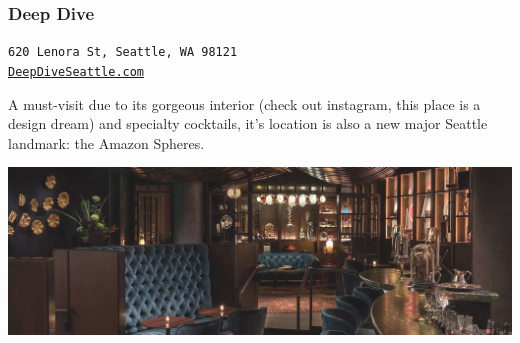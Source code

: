 \documentclass[10pt]{article}
\begin{document}
\subsubsection{Deep Dive}
\begin{center}
    \texttt{620 Lenora St, Seattle, WA 98121\\\href{https://www.deepdiveseattle.com/}{DeepDiveSeattle.com}}
\end{center}
A must-visit due to its gorgeous interior (check out instagram, this place is a design dream) and specialty cocktails, 
it’s location is also a new major Seattle landmark: the Amazon Spheres.
\begin{center}
    \includegraphics[width=\textwidth]{deepdive}
\end{center}
\end{document}
